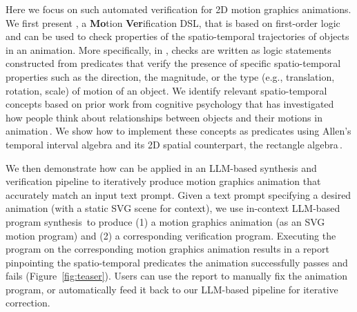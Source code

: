 Here
we focus on such automated verification for 2D motion
graphics animations.
%
We first present {\bf \dslname{}}, a {\bf Mo}tion {\bf Ver}ification DSL, 
that is based on first-order logic
%
and can be used to check properties of the spatio-temporal trajectories of objects in an animation.
%
More specifically, in \dslname{}, checks are written as logic
statements constructed from predicates that verify the presence of
specific spatio-temporal properties such as the direction, the
magnitude, or the type (e.g., translation, rotation, scale) of motion
of an object. 
%
%
%
We identify relevant spatio-temporal concepts
based on prior work from cognitive psychology
that has investigated how people think about relationships between
objects and their motions in 
animation\,\cite{talmy1983language,talmy1975motion,tversky1998space}.
%
We show how to implement these concepts as  \dslname{} predicates 
using Allen's\, temporal interval algebra
and its 2D spatial counterpart, the rectangle
algebra\,\cite{balbiani1998model,navarrete2013spatial}.


We then demonstrate how \dslname{} can be applied in an LLM-based 
synthesis and verification pipeline to iteratively produce motion graphics animation that accurately
match an input text prompt.
%
Given a text prompt specifying a desired animation (with a static SVG scene for context),
we use in-context LLM-based program
synthesis\,\cite{gupta2023visprog,surismenon2023vipergpt} to produce
(1) a motion graphics animation (as an SVG motion program) and (2) a corresponding \dslname{} 
verification program.
%
%
%
%
Executing the \dslname{} program on the corresponding
motion graphics animation results in a report pinpointing
the spatio-temporal predicates the animation successfully passes and fails (Figure~\ref{fig:teaser}).
%
Users can use the report to manually fix the animation program, or
automatically feed it back to our LLM-based pipeline for iterative correction.

